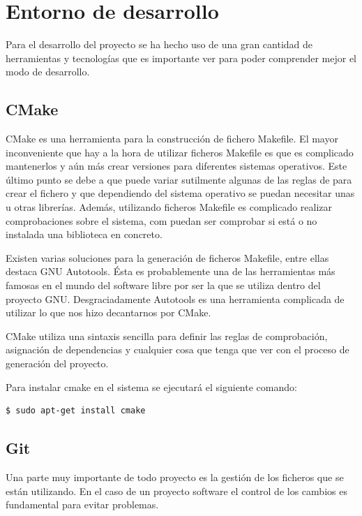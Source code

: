 \chapter{Entorno de desarrollo}\label{chap:entorno}

Para el desarrollo del proyecto se ha hecho uso de una gran cantidad de herramientas y tecnologías que es importante ver para poder comprender mejor el modo de desarrollo.

\section{CMake}

CMake es una herramienta para la construcción de fichero Makefile. El mayor inconveniente que hay a la hora de utilizar ficheros Makefile es que es complicado mantenerlos y aún más crear versiones para diferentes sistemas operativos. Este último punto se debe a que puede variar sutilmente algunas de las reglas de para crear el fichero y que dependiendo del sistema operativo se puedan necesitar unas u otras librerías. Además, utilizando ficheros Makefile es complicado realizar comprobaciones sobre el sistema, com puedan ser comprobar si está o no instalada una biblioteca en concreto.

Existen varias soluciones para la generación de ficheros Makefile, entre ellas destaca GNU Autotools. Ésta es probablemente una de las herramientas más famosas en el mundo del software libre por ser la que se utiliza dentro del proyecto GNU. Desgraciadamente Autotools es una herramienta complicada de utilizar lo que nos hizo decantarnos por CMake.

CMake utiliza una sintaxis sencilla para definir las reglas de comprobación, asignación de dependencias y cualquier cosa que tenga que ver con el proceso de generación del proyecto.

Para instalar cmake en el sistema se ejecutará el siguiente comando:

\begin{verbatim}
$ sudo apt-get install cmake
\end{verbatim}

\section{Git}

Una parte muy importante de todo proyecto es la gestión de los ficheros que se están utilizando. En el caso de un proyecto software el control de los cambios es fundamental para evitar problemas.

